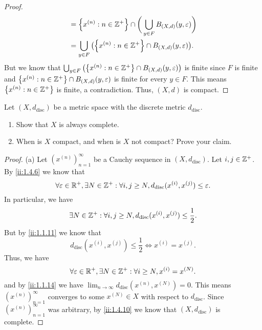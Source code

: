 \begin{proof}
\begin{align*}
                               & = \set{x^{(n)} : n \in \Z^+} \cap \bigg(\bigcup_{y \in F} B_{(X, d)}(y, \varepsilon)\bigg) \\
                               & = \bigcup_{y \in F} \big(\set{x^{(n)} : n \in \Z^+} \cap B_{(X, d)}(y, \varepsilon)\big).
  \end{align*}
  But we know that \(\bigcup_{y \in F} \big(\set{x^{(n)} : n \in \Z^+} \cap B_{(X, d)}(y, \varepsilon)\big)\) is finite since \(F\) is finite and \(\left\lbrace x^{(n)} : n \in \mathbb{Z}^+\right\rbrace \cap B_{(X, d)}(y, \varepsilon)\) is finite for every \(y \in F\).
  This means \(\left\lbrace x^{(n)} : n \in \mathbb{Z}^+\right\rbrace\) is finite, a contradiction.
  Thus, \((X, d)\) is compact.
\end{proof}

\begin{ex}\label{ii:ex:1.5.12}
  Let \((X, d_{\text{disc}})\) be a metric space with the discrete metric \(d_{\text{disc}}\).
  \begin{enumerate}
    \item Show that \(X\) is always complete.
    \item When is \(X\) compact, and when is \(X\) not compact?
          Prove your claim.
  \end{enumerate}
\end{ex}

\begin{proof}{(a)}
  Let \((x^{(n)})_{n = 1}^\infty\) be a Cauchy sequence in \((X, d_{\text{disc}})\).
  Let \(i, j \in \mathbb{Z}^+\).
  By \cref{ii:1.4.6} we know that
  \[
    \forall \varepsilon \in \mathbb{R}^+, \exists N \in \mathbb{Z}^+ : \forall i, j \geq N, d_{\text{disc}}(x^{(i)}, x^{(j)}) \leq \varepsilon.
  \]
  In particular, we have
  \[
    \exists N \in \mathbb{Z}^+ : \forall i, j \geq N, d_{\text{disc}}(x^{(i)}, x^{(j)}) \leq \dfrac{1}{2}.
  \]
  But by \cref{ii:1.1.11} we know that
  \[
    d_{\text{disc}}(x^{(i)}, x^{(j)}) \leq \dfrac{1}{2} \iff x^{(i)} = x^{(j)}.
  \]
  Thus, we have
  \[
    \forall \varepsilon \in \mathbb{R}^+, \exists N \in \mathbb{Z}^+ : \forall i \geq N, x^{(i)} = x^{(N)}.
  \]
  and by \cref{ii:1.1.14} we have \(\lim_{n \to \infty} d_{\text{disc}}(x^{(n)}, x^{(N)}) = 0\).
  This means \((x^{(n)})_{n = 1}^\infty\) converges to some \(x^{(N)} \in X\) with respect to \(d_{\text{disc}}\).
  Since \((x^{(n)})_{n = 1}^\infty\) was arbitrary, by \cref{ii:1.4.10} we know that \((X, d_{\text{disc}})\) is complete.
\end{proof}

